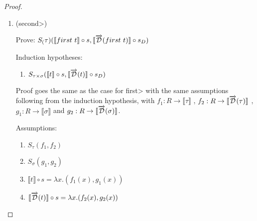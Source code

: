 \documentclass[11pt, final]{article}
\begin{document}
\begin{proof}
\begin{enumerate}
      \begin{align*}
        S&_{\tau}(\llbracket first\ t \rrbracket \circ s, \llbracket \D(first\ t) \rrbracket \circ s_D) \\
        & \Vdash \text{(Rewrite using definition of $\D$)} \\
        & S_{\tau}(\llbracket first\ t \rrbracket \circ s, \llbracket first\ \D(t) \rrbracket \circ s_D) \\
        & \Vdash \text{(Rewrite using definition of $\llbracket\rrbracket$)} \\
        & S_{\tau}(\lambda x. fst(\llbracket t \rrbracket(s(x))), \lambda x. fst(\llbracket \D(t) \rrbracket(s_D(x)))) \\
        & \Vdash \text{(Rewrite using \ref{eqn:subst_ass_proj1_6} and \ref{eqn:subst_ass_proj1_7})} \\
        & S_{\tau}(\lambda x. fst(f_1(x), g_1(x)), \lambda x. fst(f_2(x), g_2(x))) \\
        & \Vdash \text{($\beta\eta$-equality)} \\
        & S_{\tau}(f_1, f_2) \\
        & \Vdash \text{(Assumption \ref{eqn:subst_ass_proj1_4})} \\
      \end{align*} \qed

      \item (\<second>)

      Prove: $S_(\tau)(\llbracket first\ t \rrbracket \circ s, \llbracket \overrightarrow{\mathcal{D}}(first\ t) \rrbracket \circ s_D)$

      Induction hypotheses:
      \begin{enumerate}
        \item \label{eqn:subst_ih_first}$S_{\tau\times\sigma}(\llbracket t \rrbracket \circ s, \llbracket \overrightarrow{\mathcal{D}}(t) \rrbracket \circ s_D)$
      \end{enumerate}

      Proof goes the same as the case for \<first> with the same assumptions following from the induction hypothesis, with
      $f_1 : R \rightarrow \llbracket \tau \rrbracket$
      , $f_2 : R \rightarrow \llbracket \overrightarrow{\mathcal{D}}(\tau) \rrbracket$
      , $g_1 : R \rightarrow \llbracket \sigma \rrbracket$
      and $g_2 : R \rightarrow \llbracket \overrightarrow{\mathcal{D}}(\sigma) \rrbracket$.

      Assumptions:
      \begin{enumerate}
        \item \label{eqn:subst_ass_proj2_4} $S_\tau(f_1, f_2)$
        \item \label{eqn:subst_ass_proj2_5} $S_\sigma(g_1, g_2)$
        \item \label{eqn:subst_ass_proj2_6} $\llbracket t \rrbracket \circ s = \lambda x. (f_1(x), g_1(x))$
        \item \label{eqn:subst_ass_proj2_7} $\llbracket \overrightarrow{\mathcal{D}}(t) \rrbracket \circ s = \lambda x. (f_2(x), g_2(x))$
      \end{enumerate}


\end{enumerate}
\end{proof}
\end{document}
